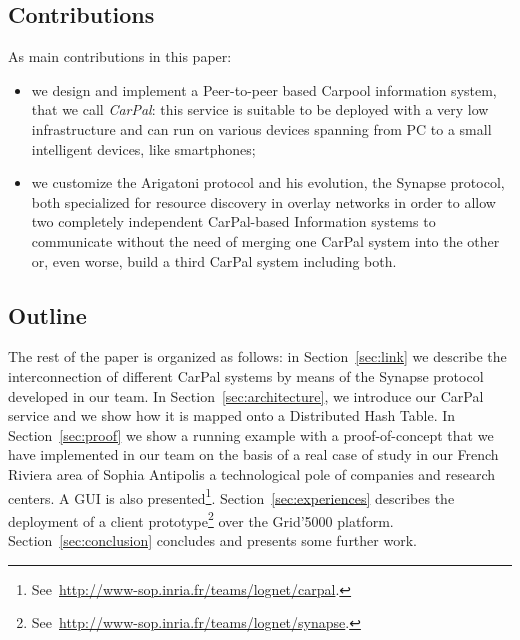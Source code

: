 \subsection{Contributions}
%
As main contributions in this paper:
%
\begin{itemize}
\item we design and implement a Peer-to-peer based Carpool information
  system, that we call \emph{CarPal}: this service is suitable to be
  deployed with a very low infrastructure and can run on various
  devices spanning from PC to a small intelligent devices, like
  smartphones;

\item we customize the Arigatoni protocol and his evolution, the
  Synapse protocol, both specialized for resource discovery in overlay
  networks in order to allow two completely independent CarPal-based
  Information systems to communicate without the need of merging one
  CarPal system into the other or, even worse, build a third CarPal
  system including both.
\end{itemize}



\subsection{Outline}
%
The rest of the paper is organized as follows: in
Section~\ref{sec:link} we describe the interconnection of different
CarPal systems by means of the Synapse protocol developed in our
team. In Section~\ref{sec:architecture}, we introduce our CarPal
service and we show how it is mapped onto a Distributed Hash Table.
In Section~\ref{sec:proof} we show a running example with a
proof-of-concept that we have implemented in our team on the basis of
a real case of study in our French Riviera area of Sophia Antipolis a
technological pole of companies and research centers. A GUI is also
presented\footnote{See~\url{http://www-sop.inria.fr/teams/lognet/carpal}.}.
Section~\ref{sec:experiences} describes the deployment of a client
prototype\footnote{See~\url{http://www-sop.inria.fr/teams/lognet/synapse}.}
over the Grid'5000 platform.  Section~\ref{sec:conclusion} concludes
and presents some further work.
